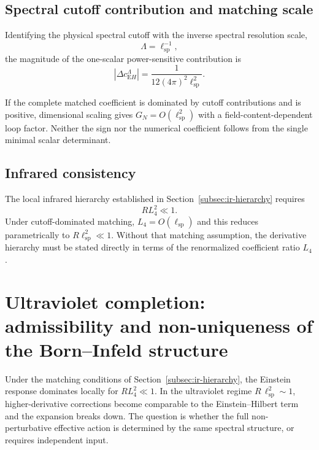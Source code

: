 \documentclass[pdflatex,sn-mathphys-num]{sn-jnl} %
\theoremstyle{remark}
\theoremstyle{plain}
\begin{document}
  \subsection{Spectral cutoff contribution and matching scale}
    \label{subsec:spectral-cutoff}

    Identifying the physical spectral cutoff with the inverse spectral resolution scale,
    \begin{equation}
      \Lambda=\ell_{\mathrm{sp}}^{-1},
    \end{equation}
    the magnitude of the one-scalar power-sensitive contribution is
    \begin{equation}
      \left|\Delta c_{\mathrm EH}^{\Lambda}\right|
      =
      \frac{1}{12(4\pi)^2\ell_{\mathrm{sp}}^2}.
    \end{equation}

    If the complete matched coefficient is dominated by cutoff contributions and is positive, dimensional scaling
    gives $G_N=O(\ell_{\mathrm{sp}}^2)$ with a field-content-dependent loop factor.
    Neither the sign nor the numerical coefficient follows from the single minimal scalar determinant.

  \subsection{Infrared consistency}
    \label{subsec:ir-consistency}

    The local infrared hierarchy established in Section~\ref{subsec:ir-hierarchy} requires
    \begin{equation}
      R L_4^2\ll1.
    \end{equation}
    Under cutoff-dominated matching, $L_4=O(\ell_{\mathrm{sp}})$ and this reduces parametrically to
    $R\ell_{\mathrm{sp}}^2\ll1$.
    Without that matching assumption, the derivative hierarchy must be stated directly in terms of the renormalized
    coefficient ratio $L_4$.

  \section{Ultraviolet completion: admissibility and non-uniqueness of the
  Born--Infeld structure}
  \label{sec:UV-completion}

  Under the matching conditions of Section~\ref{subsec:ir-hierarchy}, the Einstein response dominates locally for
  $RL_4^2\ll1$.
  In the ultraviolet regime
  $R\,\ell_{\mathrm{sp}}^{2} \sim 1$,
  higher-derivative corrections become comparable to the
  Einstein--Hilbert term and the expansion breaks down.
  The question is whether the full non-perturbative
  effective action is determined by the same spectral
  structure, or requires independent input.
\end{document}
